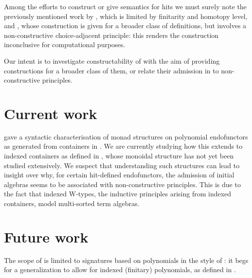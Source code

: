 \documentclass[a4paper]{article}
\begin{document}
Among the efforts to construct or give semantics for \glspl{hit} we must surely note the previously mentioned work by \textcite{Weide2019}, which is limited by finitarity and homotopy level, and \textcite{Fiore2022}, whose construction is given for a broader class of definitions, but involves a non-constructive choice-adjacent principle: this renders the construction inconclusive for computational purposes.

Our intent is to investigate constructability of  with the aim of providing constructions for a broader class of them, or relate their admission in  to non-constructive principles.

\section{Current work}

\textcite{Uustalu2017} gave a syntactic characterisation of monad structures on polynomial endofunctors as generated from containers in \cite{Abbott2005}. We are currently studying how this extends to indexed containers as defined in \cite{Altenkirch2015}, whose monoidal structure has not yet been studied extensively. We suspect that understanding such structures can lead to insight over why, for certain \gls{hit}-defined endofunctors, the admission of initial algebras seems to be associated with non-constructive principles. This is due to the fact that indexed W-types, the inductive principles arising from indexed containers, model multi-sorted term algebras.

\section{Future work}

The scope of \cite{Weide2019} is limited to signatures based on polynomials in the style of \cite{Goldblatt2001}: it begs for a generalization to allow for indexed (finitary) polynomials, as defined in \cite{Altenkirch2015}.

\printacronyms
\printbibliography
\end{document}
